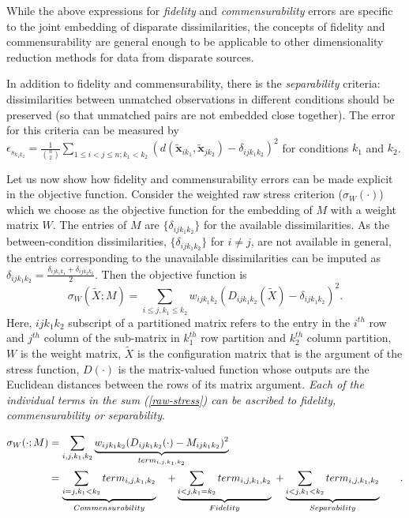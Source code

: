 \documentclass[12pt]{article} %
\begin{document}
While  the above expressions for  \emph{fidelity} and  \emph{commensurability} errors  are specific to the joint embedding of disparate dissimilarities, the concepts of fidelity and commensurability are  general enough to be applicable to other dimensionality reduction methods for data from disparate sources. 

 In addition to fidelity and commensurability, there is the \emph{separability} criteria:  dissimilarities between unmatched  observations in different conditions  should be preserved (so that unmatched pairs are not embedded close together).  The error for this criteria can be measured by  $\epsilon_{s_{k_1k_2}} = \frac{1}{{{n}\choose{2}}} \sum_{1 \leq i < j \leq n;k_1 <k_2} (d(\widetilde{\bm{x}}_{ik_1},\widetilde{\bm{x}}_{jk_2})-{ \delta_{ijk_1k_2}})^2$ for  conditions   $k_1$ and  $k_2$.

Let us now show how fidelity and commensurability errors  can be made explicit in the objective function. Consider the weighted raw stress criterion ($\sigma_{W}(\cdot)$) which we choose as the objective function for the embedding  of  $M$ with a weight matrix $W$. The entries of $M$ are $\{\delta_{ijk_1k_2}\}$ for the available dissimilarities. As the between-condition dissimilarities, 
$\{\delta_{ijk_1k_2}\}$ for $i\neq j$, are  not available in general, the entries corresponding to the unavailable dissimilarities can be imputed as $
\delta_{ijk_1k_2}=\frac{\delta_{ijk_1k_1}+\delta_{ijk_2k_2}}{2} \label{impute}$. Then the objective function is
\begin{equation}
\sigma_{W}(\widetilde{X};M)=\sum_{i\leq j,k_1\leq k_2} {w_{ijk_1k_2}(D_{ijk_1k_2}(\widetilde{X})-\delta_{ijk_1k_2})^2  }\label{raw-stress}.
\end{equation}
 Here, $ijk_1k_2$ subscript of a partitioned matrix refers to the entry in the $i^{th}$ row and $j^{th}$ column of the sub-matrix in $k_1^{th}$ row partition and $k_2^{th}$ column partition, $W$ is the weight matrix, $\widetilde{X}$ is the configuration matrix that is the argument of the stress function, $D(\cdot)$ is the matrix-valued function whose outputs are the Euclidean distances between the rows of its matrix argument.   \emph{Each of the individual terms in the sum \textrm{(\ref{raw-stress})} can be ascribed to fidelity, commensurability or separability}. %


\begin{align}
\sigma_W(\cdot;M)  &=  \sum_{i,j,k_1,k_2} \underbrace{{w_{ij{k_1}{k_2}}(D_{ij{k_1}{k_2}}(\cdot)-M_{ijk_1k_2})^2 }}_{term_{i,j,k_1,k_2}}  & \notag\\
\hspace{3pt} &=  \underbrace{\sum_{i=j,k_1<k_2}  term_{i,j,k_1,k_2}}_{Commensurability}  \hspace{10pt}    +  \underbrace{\sum_{i<j,k_1=k_2}   term_{i,j,k_1,k_2}  } _{Fidelity}
\hspace{3pt}+  \underbrace{\sum_{i< j,k_1<k_2}  term_{i,j,k_1,k_2}  } _{Separability}\label{eq:FidCommSep}\hspace{10pt} &.
\end{align}
\end{document}
